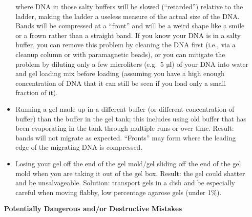 \documentclass[
  letterpaper,
  DIV=11,
  numbers=noendperiod]{scrreprt}
\begin{document}
\begin{itemize}
  where DNA in those salty buffers will be slowed (``retarded'')
  relative to the ladder, making the ladder a useless measure of the
  actual size of the DNA. Bands will be compressed at a ``front'' and
  will be a weird shape like a smile or a frown rather than a straight
  band. If you know your DNA is in a salty buffer, you can remove this
  problem by cleaning the DNA first (i.e., via a cleanup column or with
  paramagnetic beads), or you can mitigate the problem by diluting only
  a few microliters (e.g.~5 µl) of your DNA into water and gel loading
  mix before loading (assuming you have a high enough concentration of
  DNA that it can still be seen if you load only a small fraction of
  it).
\item
  Running a gel made up in a different buffer (or different
  concentration of buffer) than the buffer in the gel tank; this
  includes using old buffer that has been evaporating in the tank
  through multiple runs or over time. Result: bands will not migrate as
  expected. ``Fronts'' may form where the leading edge of the migrating
  DNA is compressed.
\item
  Losing your gel off the end of the gel mold/gel sliding off the end of
  the gel mold when you are taking it out of the gel box. Result: the
  gel could shatter and be unsalvageable. Solution: transport gels in a
  dish and be especially careful when moving flabby, low percentage
  agarose gels (under 1\%).
\end{itemize}

\textbf{Potentially Dangerous and/or Destructive Mistakes}
\end{document}
